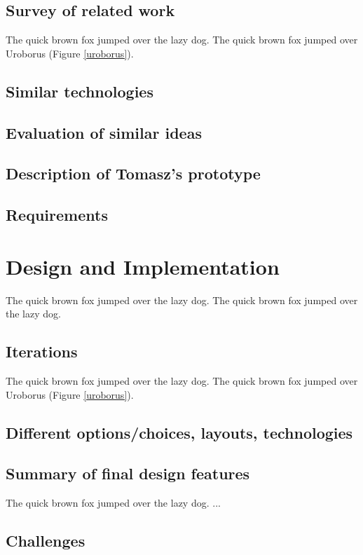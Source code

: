 \documentclass{l4proj}
\begin{document}
\section{Survey of related work}
The quick brown fox jumped over the lazy dog.
The quick brown fox jumped over Uroborus (Figure \ref{uroborus}).

\section{Similar technologies}

\section{Evaluation of similar ideas}

\section{Description of Tomasz's prototype}

\section{Requirements}

\chapter{Design and Implementation}
The quick brown fox jumped over the lazy dog.
The quick brown fox jumped over the lazy dog.

\section{Iterations}
The quick brown fox jumped over the lazy dog.
The quick brown fox jumped over Uroborus (Figure \ref{uroborus}).

\section{Different options/choices, layouts, technologies}

\section{Summary of final design features}
The quick brown fox jumped over the lazy dog.
...

\section{Challenges}
\end{document}
